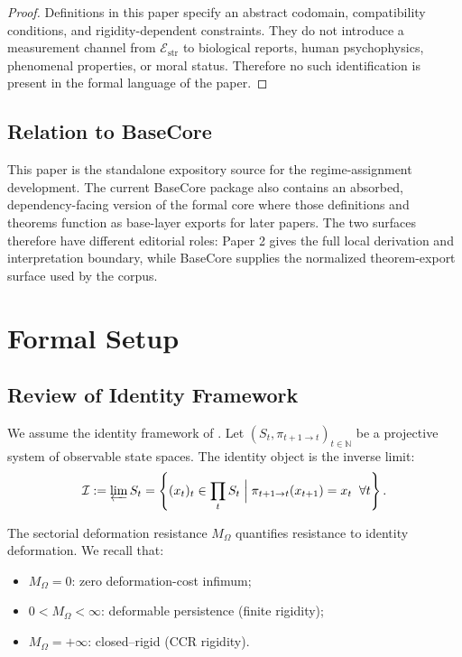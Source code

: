\documentclass[11pt,a4paper]{article}
\theoremstyle{plain}
\theoremstyle{definition}
\theoremstyle{remark}
\begin{document}
\begin{proof}
Definitions in this paper specify an abstract codomain, compatibility
conditions, and rigidity-dependent constraints. They do not introduce a
measurement channel from $\mathcal{E}_{\mathrm{str}}$ to biological reports,
human psychophysics, phenomenal properties, or moral status. Therefore no such
identification is present in the formal language of the paper.
\end{proof}

\subsection{Relation to BaseCore}

This paper is the standalone expository source for the regime-assignment
development. The current BaseCore package also contains an absorbed,
dependency-facing version of the formal core where those definitions and
theorems function as base-layer exports for later papers. The two surfaces
therefore have different editorial roles: Paper 2 gives the full local
derivation and interpretation boundary, while BaseCore supplies the normalized
theorem-export surface used by the corpus.

\section{Formal Setup}

\subsection{Review of Identity Framework}

We assume the identity framework of \cite{paper1}. Let $(S_t, \pi_{t+1 \to t})_{t \in \mathbb{N}}$ be a projective system of observable state spaces. The identity object is the inverse limit:
\begin{equation}
    \mathcal{I} := \varprojlim S_t = \left\{ (x_t)_t \in \prod_t S_t \;\Big|\; \pi_{t+1 \to t}(x_{t+1}) = x_t \;\; \forall t \right\}.
\end{equation}

The sectorial deformation resistance $M_\Omega$ quantifies resistance to identity deformation. We recall that:
\begin{itemize}[leftmargin=*]
    \item $M_\Omega = 0$: zero deformation-cost infimum;
    \item $0 < M_\Omega < \infty$: deformable persistence (finite rigidity);
    \item $M_\Omega = +\infty$: closed--rigid (CCR rigidity).
\end{itemize}
\end{document}
